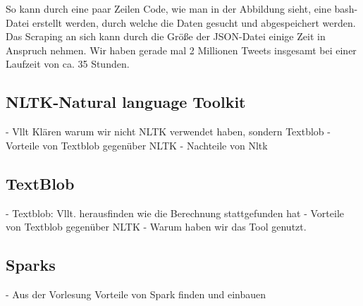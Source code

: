 	
	So kann durch eine paar Zeilen Code, wie man in der Abbildung \label{polPolar} sieht, eine bash-Datei erstellt werden, durch welche die Daten gesucht und 
	abgespeichert werden. Das Scraping an sich kann durch die Größe der JSON-Datei einige Zeit in Anspruch nehmen. Wir haben gerade mal 2 Millionen Tweets 
	insgesamt bei einer Laufzeit von ca. 35 Stunden.  
	

	\subsection{NLTK-Natural language Toolkit}
	- Vllt Klären warum wir nicht NLTK verwendet haben, sondern Textblob
	- Vorteile von Textblob gegenüber NLTK
	- Nachteile von Nltk	
	

	\subsection{TextBlob}
	- Textblob: Vllt. herausfinden wie die Berechnung stattgefunden hat	
	- Vorteile von Textblob gegenüber NLTK
	- Warum haben wir das Tool genutzt.	
	

	\subsection{Sparks}
	- Aus der Vorlesung Vorteile von Spark finden und einbauen	
	


	
